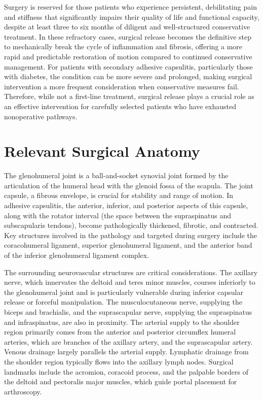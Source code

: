 Surgery is reserved for those patients who experience persistent, debilitating pain and stiffness that significantly impairs their quality of life and functional capacity, despite at least three to six months of diligent and well-structured conservative treatment. In these refractory cases, surgical release becomes the definitive step to mechanically break the cycle of inflammation and fibrosis, offering a more rapid and predictable restoration of motion compared to continued conservative management. For patients with secondary adhesive capsulitis, particularly those with diabetes, the condition can be more severe and prolonged, making surgical intervention a more frequent consideration when conservative measures fail. Therefore, while not a first-line treatment, surgical release plays a crucial role as an effective intervention for carefully selected patients who have exhausted nonoperative pathways.

\section*{Relevant Surgical Anatomy}
The glenohumeral joint is a ball-and-socket synovial joint formed by the articulation of the humeral head with the glenoid fossa of the scapula. The joint capsule, a fibrous envelope, is crucial for stability and range of motion. In adhesive capsulitis, the anterior, inferior, and posterior aspects of this capsule, along with the rotator interval (the space between the supraspinatus and subscapularis tendons), become pathologically thickened, fibrotic, and contracted. Key structures involved in the pathology and targeted during surgery include the coracohumeral ligament, superior glenohumeral ligament, and the anterior band of the inferior glenohumeral ligament complex.

The surrounding neurovascular structures are critical considerations. The axillary nerve, which innervates the deltoid and teres minor muscles, courses inferiorly to the glenohumeral joint and is particularly vulnerable during inferior capsular release or forceful manipulation. The musculocutaneous nerve, supplying the biceps and brachialis, and the suprascapular nerve, supplying the supraspinatus and infraspinatus, are also in proximity. The arterial supply to the shoulder region primarily comes from the anterior and posterior circumflex humeral arteries, which are branches of the axillary artery, and the suprascapular artery. Venous drainage largely parallels the arterial supply. Lymphatic drainage from the shoulder region typically flows into the axillary lymph nodes. Surgical landmarks include the acromion, coracoid process, and the palpable borders of the deltoid and pectoralis major muscles, which guide portal placement for arthroscopy.

